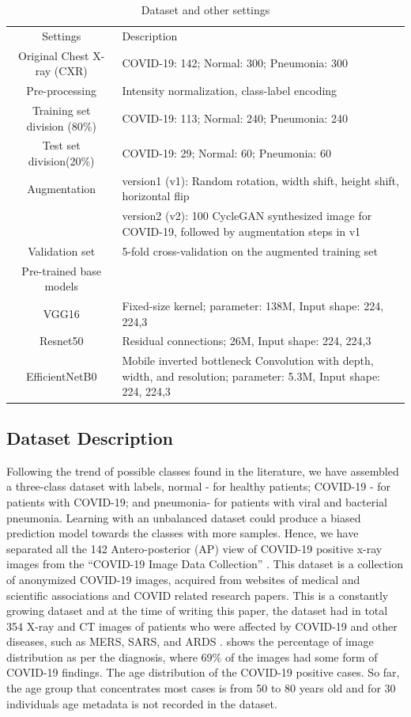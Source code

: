 \begin{table}{
\centering
\caption{Dataset and other settings }\label{data}
\begin{tabularx}{0.95\textwidth}{c X}
\toprule
Settings & Description\\
\otoprule
Original Chest X-ray (CXR)& COVID-19: 142; Normal: 300; Pneumonia: 300 \\
Pre-processing & Intensity normalization, class-label encoding  \\
Training set division (80\%)& COVID-19: 113; Normal: 240; Pneumonia: 240 \\
Test set division(20\%)&COVID-19: 29; Normal: 60; Pneumonia: 60 \\
Augmentation & version1 (v1): Random rotation, width shift, height shift, horizontal flip\\
 & version2 (v2): 100 CycleGAN  synthesized image for COVID-19, followed by augmentation steps in v1 \\
Validation set & 5-fold cross-validation on the augmented training set\\
Pre-trained base models & \\
VGG16& Fixed-size kernel; parameter: 138M, Input shape:  224, 224,3\\
Resnet50\cite{he2016deep}  &Residual connections;  26M, Input shape:  224, 224,3 \\
EfficientNetB0 \cite{tan2019efficientnet}& Mobile inverted bottleneck Convolution with depth, width, and resolution; parameter: 5.3M, Input shape:  224, 224,3\\

\bottomrule
\end{tabularx}}
\end{table}

\subsection{Dataset Description}

Following the trend of possible classes found in the literature, we have assembled a three-class dataset with labels,  normal - for healthy patients;  COVID-19 - for patients with COVID-19; and pneumonia- for patients with viral and bacterial pneumonia. Learning with an unbalanced dataset could produce a biased prediction model towards the classes with more samples. Hence, we have separated all the 142 Antero-posterior (AP) view of COVID-19 positive x-ray images from the “COVID-19 Image Data Collection” \cite{cohen2020covid}. This dataset is a collection of anonymized COVID-19 images, acquired from websites of medical and scientific associations and COVID related research papers. This is a constantly growing dataset and at the time of writing this paper, the dataset had in total 354 X-ray and CT images of patients who were affected by COVID-19 and other diseases, such as MERS, SARS, and ARDS \cite{araujo2020covid}.  shows the percentage of image distribution as per the diagnosis, where 69\% of the images had some form of COVID-19 findings. The age distribution of the COVID-19 positive cases. So far, the age group that concentrates most cases is from 50 to 80 years old and for 30 individuals age metadata is not recorded in the dataset. 

